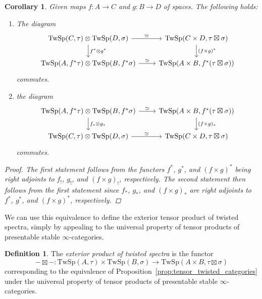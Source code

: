 \documentclass[10pt]{amsart}
\newcommand{\longto}{\longrightarrow}
\theoremstyle{plain}
\newtheorem{corollary}[theorem]{Corollary}
\theoremstyle{definition}
\newtheorem{definition}[theorem]{Definition}
\newcommand{\TwSp}{\mathrm{TwSp}}
\begin{document}
\begin{corollary} \label{cor:natural_pullback_and_right_adjoint}
  Given maps $f : A \to C$ and $g : B \to D$ of spaces. The following holds:
  \begin{enumerate}
    \item The diagram
    \[
    \begin{tikzcd}
      \TwSp(C,\tau) \otimes \TwSp(D,\sigma) \arrow[d,"f^* \otimes g^*"] \arrow[r,"\simeq"] & \TwSp(C \times D , \tau \boxtimes \sigma) \arrow[d,"(f \times g)^*"] \\
      \TwSp(A, f^* \tau) \otimes \TwSp(B,f^* \sigma) \arrow[r,"\simeq"] & \TwSp(A \times B, f^* (\tau \boxtimes \sigma))
    \end{tikzcd}
    \]
    commutes.
    \item the diagram
    \[
    \begin{tikzcd}
      \TwSp(A, f^* \tau) \otimes \TwSp(B,f^* \sigma) \arrow[d,"f_\ast \otimes g_\ast"] \arrow[r,"\simeq"] & \TwSp(A \times B, f^* (\tau \boxtimes \sigma)) \arrow[d,"(f \times g)_\ast"] \\
      \TwSp(C,\tau) \otimes \TwSp(D,\sigma) \arrow[r,"\simeq"] & \TwSp(C \times D , \tau \boxtimes \sigma)
    \end{tikzcd}
    \]
    commutes.
  \end{enumerate}
  \begin{proof}
    The first statement follows from the functors $f^*$, $g^*$, and $(f \times g)^*$ being right adjoints to $f_!$, $g_!$, and $(f \times g)_!$, respectively. The second statement then follows from the first statement since $f_*$, $g_*$, and $(f \times g)_*$ are right adjoints to $f^*$, $g^*$, and $(f \times g)^*$, respectively.
  \end{proof}
\end{corollary}

We can use this equivalence to define the exterior tensor product of twisted spectra, simply by appealing to the universal property of tensor products of presentable stable $\infty$-categories.

\begin{definition}
  The \emph{exterior product of twisted spectra} is the functor
  \[
  - \boxtimes - : \TwSp(A, \tau) \times \TwSp(B,\sigma) \longto \TwSp(A \times B , \tau \boxtimes \sigma)
  \]
  corresponding to the equivalence of Proposition~\ref{prop:tensor_twisted_categories} under the universal property of tensor products of presentable stable $\infty$-categories.
\end{definition}
\end{document}
